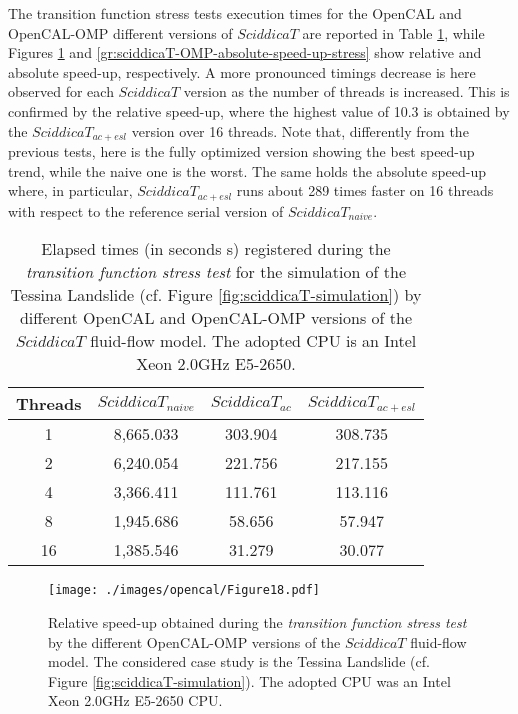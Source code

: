 The transition function stress tests execution times for the
OpenCAL and OpenCAL-OMP different versions of $SciddicaT$ are
reported in Table \ref{tab:sciddicaT-OMP-execution-times-stress},
while Figures \ref{gr:sciddicaT-OMP-relative-speed-up-stress} and
\ref{gr:sciddicaT-OMP-absolute-speed-up-stress} show relative and
absolute speed-up, respectively. A more pronounced timings
decrease is here observed for each $SciddicaT$ version as the
number of threads is increased. This is confirmed by the relative
speed-up, where the highest value of 10.3 is obtained by the
$SciddicaT_{ac+esl}$ version over 16 threads. Note that,
differently from the previous tests, here is the fully optimized
version showing the best speed-up trend, while the naive one is
the worst. The same holds the absolute speed-up where, in
particular, $SciddicaT_{ac+esl}$ runs about 289 times faster on 16
threads with respect to the reference serial version of
$SciddicaT_{naive}$.
\begin{table}
	\centering
	\begin{tabular}{cccc}
		\hline Threads & $SciddicaT_{naive}$ & $SciddicaT_{ac}$ &
		$SciddicaT_{ac+esl}$ \\ \hline 1 & 8,665.033 & 303.904 &
		308.735\\ 2 & 6,240.054 & 221.756 & 217.155\\ 4 & 3,366.411 &
		111.761 & 113.116\\ 8 & 1,945.686 & 58.656 & 57.947\\ 16 &
		1,385.546 & 31.279 & 30.077\\ \hline
	\end{tabular}
	\caption{Elapsed times (in seconds \si{s}) registered during the \emph{transition function stress test} for the simulation of the Tessina Landslide
		(cf. Figure \ref{fig:sciddicaT-simulation}) by different OpenCAL and
		OpenCAL-OMP versions of the $SciddicaT$ fluid-flow model. The adopted
		CPU is an Intel Xeon 2.0GHz E5-2650.}
	\label{tab:sciddicaT-OMP-execution-times-stress}
\end{table}

\begin{figure}
	\begin{center}
		\texttt{[image: ./images/opencal/Figure18.pdf]}
		\caption{Relative speed-up obtained during the \emph{transition function stress
				test} by the different OpenCAL-OMP versions of the $SciddicaT$
			fluid-flow model. The considered case study is the Tessina Landslide
			(cf. Figure \ref{fig:sciddicaT-simulation}). The adopted CPU was an
			Intel Xeon 2.0GHz E5-2650 CPU.}
		\label{gr:sciddicaT-OMP-relative-speed-up-stress}
	\end{center}
\end{figure}


